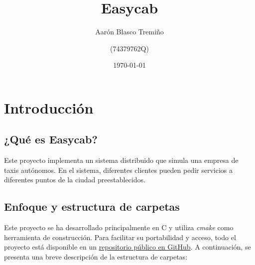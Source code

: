 \documentclass[a4paper,12pt]{article}
\title{Easycab}
\author{Aarón Blasco Tremiño \and (74379762Q)}
\date{\today}
\begin{document}
\maketitle

\clearpage
\hypersetup{linkcolor=black, urlcolor=cyan}
\tableofcontents  %
\hypersetup{linkcolor=blue, urlcolor=blue, filecolor=cyan}
\clearpage

\section{Introducción}
\subsection{¿Qué es Easycab?}
Este proyecto implementa un sistema distribuido que simula una empresa
de taxis autónomos. En el sistema, diferentes clientes pueden pedir
servicios a diferentes puntos de la ciudad preestablecidos.

\subsection{Enfoque y estructura de carpetas}
Este proyecto se ha desarrollado principalmente en C y utiliza \textit{cmake} como herramienta de construcción.
Para facilitar su portabilidad y acceso, todo el proyecto está disponible en un
\href{https://github.com/abtb2-ua/easycab}{repositorio público en GitHub}. A continuación, se presenta una breve
descripción de la estructura de carpetas:
\end{document}
